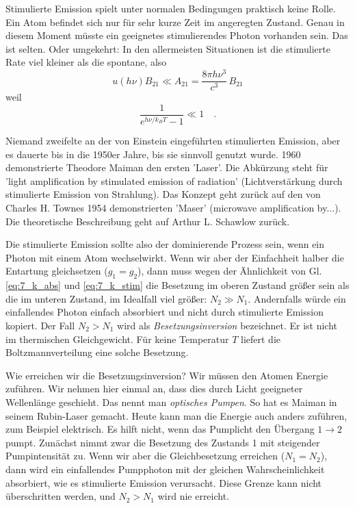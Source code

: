 Stimulierte Emission spielt unter normalen Bedingungen praktisch keine Rolle. Ein Atom befindet sich nur für sehr kurze Zeit im angeregten Zustand. Genau in diesem Moment müsste ein geeignetes stimulierendes Photon vorhanden sein. Das ist selten. Oder umgekehrt: In den allermeisten Situationen ist die stimulierte Rate viel kleiner als die spontane, also 
\begin{equation}
    u(h\nu)  B_{21}  \ll A_{21} = \frac{8 \pi h \nu^3}{c^3} \, B_{21} 
\end{equation}
weil 
\begin{equation} 
    \frac{1}{e^{h\nu/k_B T} -1} \ll 1 \quad .
\end{equation}

Niemand zweifelte an der von Einstein eingeführten stimulierten Emission, aber es dauerte bis in die 1950er Jahre, bis sie sinnvoll genutzt wurde. 1960 demonstrierte Theodore Maiman den ersten 'Laser'. Die Abkürzung steht für 'light amplification by stimulated emission of radiation' (Lichtverstärkung durch stimulierte Emission von Strahlung). Das Konzept geht zurück auf den von Charles H. Townes 1954 demonstrierten 'Maser' (microwave amplification by...). Die theoretische Beschreibung geht auf Arthur L. Schawlow zurück.

Die stimulierte Emission sollte also der dominierende Prozess sein, wenn ein Photon mit einem Atom wechselwirkt. Wenn wir aber der Einfachheit halber die Entartung gleichsetzen ($g_1 = g_2$), dann muss wegen der Ähnlichkeit von Gl. \ref{eq:7_k_abs} und \ref{eq:7_k_stim} die Besetzung im oberen Zustand größer sein als die im unteren Zustand, im Idealfall viel größer: $N_2 \gg N_1$. Andernfalls würde ein einfallendes Photon einfach absorbiert und nicht durch stimulierte Emission kopiert. Der Fall $N_2 > N_1$ wird als \emph{Besetzungsinversion} bezeichnet. Er ist nicht im thermischen Gleichgewicht. Für keine Temperatur $T$ liefert die Boltzmannverteilung eine solche Besetzung.

Wie erreichen wir die Besetzungsinversion? Wir müssen den Atomen Energie zuführen. Wir nehmen hier einmal an, dass dies durch Licht geeigneter Wellenlänge geschieht. Das nennt man \emph{optisches Pumpen}. So hat es Maiman in seinem Rubin-Laser gemacht. Heute kann man die Energie auch anders zuführen, zum Beispiel elektrisch. Es hilft nicht, wenn das Pumplicht den Übergang $1 \rightarrow 2$ pumpt. Zunächst nimmt zwar die Besetzung des Zustands 1 mit steigender Pumpintensität zu. Wenn wir aber die Gleichbesetzung erreichen ($N_1 = N_2$), dann wird ein einfallendes Pumpphoton mit der gleichen Wahrscheinlichkeit absorbiert, wie es stimulierte Emission verursacht. Diese Grenze kann nicht überschritten werden, und $N_2 > N_1$ wird nie erreicht.


